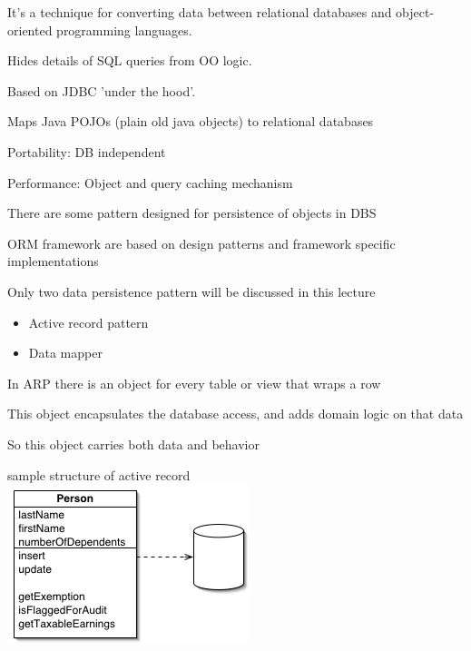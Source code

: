 \documentclass{beamer}
\begin{document}
\begin{slide}{
\item It's a technique for converting data between relational databases and object-oriented programming languages.
\pause
\item Hides details of SQL queries from OO logic.
\pause
\item Based on JDBC 'under the hood'.
\pause 
\item Maps Java POJOs (plain old java objects) to relational databases
\pause 
\item Portability: DB independent
\pause 
\item Performance: Object and query caching mechanism 
}
\end{slide}

\begin{slide}{
\item There are some pattern designed for persistence of objects in DBS
\item ORM framework are based on design patterns and framework specific implementations
\item Only two data persistence pattern will be discussed in this lecture
\pause 
\begin{itemize}
\item Active record pattern
\item Data mapper
\end{itemize}
}\end{slide}

\begin{slide}{
\item In ARP there is an object for every table or view that wraps a row
\item This object encapsulates the database access, and adds domain logic on that data
\pause
\item So this object carries both data and behavior 
}\end{slide}

\begin{slide}{
\item sample structure of active record 
\\
\includegraphics[scale=0.7]{img/activeRecordSketch.png}
}\end{slide}
\end{document}
